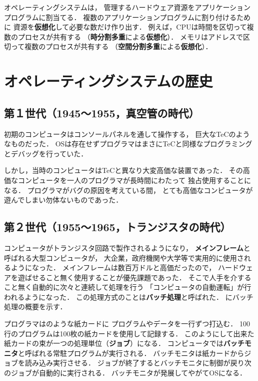 オペレーティングシステムは，
管理するハードウェア資源をアプリケーションプログラムに割当てる．
複数のアプリケーションプログラムに割り付けるために
資源を{\bf 仮想化}して必要な数だけ作り出す．
例えば，CPUは時間を区切って複数のプロセスが共有する
（{\bf 時分割多重}による{\bf 仮想化}）．
メモリはアドレスで区切って複数のプロセスが共有する
（{\bf 空間分割多重}による{\bf 仮想化}）．


\section{オペレーティングシステムの歴史}

\subsection{第１世代（1945〜1955，真空管の時代）}
初期のコンピュータはコンソールパネルを通して操作する，
巨大なTeCのようなものだった．
OSは存在せずプログラマはまさにTeCと同様なプログラミングとデバッグを行っていた．

しかし，当時のコンピュータはTeCと異なり大変高価な装置であった．
その高価なコンピュータを一人のプログラマが長時間にわたって
独占使用することになる．
プログラマがバグの原因を考えている間，
とても高価なコンピュータが遊んでしまい勿体ないものであった．

\subsection{第２世代（1955〜1965，トランジスタの時代）}
\label{gen2nd}
コンピュータがトランジスタ回路で製作されるようになり，
{\bf メインフレーム}と呼ばれる大型コンピュータが，
大企業，政府機関や大学等で実用的に使用されるようになった．
メインフレームは数百万ドルと高価だったので，
ハードウェアを遊ばせること無く使用することが優先課題であった．
そこで人手を介すること無く自動的に次々と連続して処理を行う
「コンピュータの自動運転」が行われるようになった．
この処理方式のことは{\bf バッチ処理}と呼ばれた．
にバッチ処理の概要を示す．

プログラマはのような紙カードに
プログラムやデータを一行ずつ打込む．
100行のプログラムは100枚の紙カードを使用して記録する．
このようにして出来た紙カードの束が一つの処理単位（{\bf ジョブ}）になる．
コンピュータでは{\bf バッチモニタ}と呼ばれる常駐プログラムが実行される．
バッチモニタは紙カードからジョブを読み込み実行させる．
ジョブが終了するとバッチモニタに制御が戻り次のジョブが自動的に実行される．
バッチモニタが発展してやがてOSになる．

